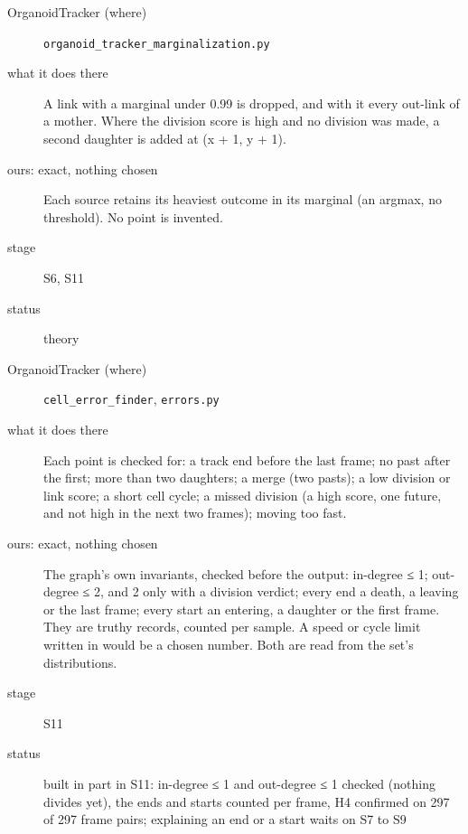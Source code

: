 \begin{description}
\item[{OrganoidTracker (where)}] \texttt{organoid\_\allowbreak{}tracker\_\allowbreak{}marginalization.\allowbreak{}py}
\item[{what it does there}] A link with a marginal under 0.99 is dropped, and with it every out-link of a mother. Where the division score is high and no division was made, a second daughter is added at (x + 1, y + 1).
\item[{ours: exact, nothing chosen}] Each source retains its heaviest outcome in its marginal (an argmax, no threshold). No point is invented.
\item[{stage}] S6, S11
\item[{status}] theory
\end{description}

\begin{description}
\item[{OrganoidTracker (where)}] \texttt{cell\_\allowbreak{}error\_\allowbreak{}finder}, \texttt{errors.\allowbreak{}py}
\item[{what it does there}] Each point is checked for: a track end before the last frame; no past after the first; more than two daughters; a merge (two pasts); a low division or link score; a short cell cycle; a missed division (a high score, one future, and not high in the next two frames); moving too fast.
\item[{ours: exact, nothing chosen}] The graph's own invariants, checked before the output: in-degree ≤ 1; out-degree ≤ 2, and 2 only with a division verdict; every end a death, a leaving or the last frame; every start an entering, a daughter or the first frame. They are truthy records, counted per sample. A speed or cycle limit written in would be a chosen number. Both are read from the set's distributions.
\item[{stage}] S11
\item[{status}] built in part in S11: in-degree ≤ 1 and out-degree ≤ 1 checked (nothing divides yet), the ends and starts counted per frame, H4 confirmed on 297 of 297 frame pairs; explaining an end or a start waits on S7 to S9
\end{description}


